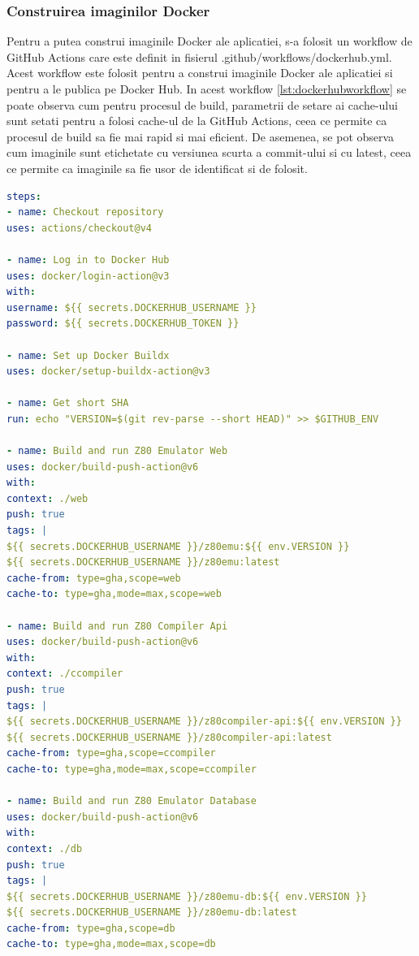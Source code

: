 \documentclass[titlepage,12pt]{article}
\DeclareRobustCommand{\code}[1]{{\ttfamily\small #1}}
\begin{document}
\subsubsection{Construirea imaginilor Docker}
Pentru a putea construi imaginile Docker ale aplicatiei, s-a folosit un workflow de GitHub Actions care este definit in fisierul \code{.github/workflows/dockerhub.yml}. Acest workflow este folosit pentru a construi imaginile Docker ale aplicatiei si pentru a le publica pe Docker Hub. In acest workflow \cref{lst:dockerhubworkflow} se poate observa cum pentru procesul de build, parametrii de setare ai cache-ului sunt setati pentru a folosi cache-ul de la GitHub Actions, ceea ce permite ca procesul de build sa fie mai rapid si mai eficient. De asemenea, se pot observa cum imaginile sunt etichetate cu versiunea scurta a commit-ului si cu \code{latest}, ceea ce permite ca imaginile sa fie usor de identificat si de folosit.

\begin{lstlisting}[language=yaml,caption={Workflow de construire a imaginilor Docker},label={lst:dockerhubworkflow}]
steps:
- name: Checkout repository
uses: actions/checkout@v4

- name: Log in to Docker Hub
uses: docker/login-action@v3
with:
username: ${{ secrets.DOCKERHUB_USERNAME }}
password: ${{ secrets.DOCKERHUB_TOKEN }}

- name: Set up Docker Buildx
uses: docker/setup-buildx-action@v3

- name: Get short SHA
run: echo "VERSION=$(git rev-parse --short HEAD)" >> $GITHUB_ENV

- name: Build and run Z80 Emulator Web
uses: docker/build-push-action@v6
with:
context: ./web
push: true
tags: |
${{ secrets.DOCKERHUB_USERNAME }}/z80emu:${{ env.VERSION }}
${{ secrets.DOCKERHUB_USERNAME }}/z80emu:latest
cache-from: type=gha,scope=web
cache-to: type=gha,mode=max,scope=web

- name: Build and run Z80 Compiler Api
uses: docker/build-push-action@v6
with:
context: ./ccompiler
push: true
tags: |
${{ secrets.DOCKERHUB_USERNAME }}/z80compiler-api:${{ env.VERSION }}
${{ secrets.DOCKERHUB_USERNAME }}/z80compiler-api:latest
cache-from: type=gha,scope=ccompiler
cache-to: type=gha,mode=max,scope=ccompiler

- name: Build and run Z80 Emulator Database
uses: docker/build-push-action@v6
with:
context: ./db
push: true
tags: |
${{ secrets.DOCKERHUB_USERNAME }}/z80emu-db:${{ env.VERSION }}
${{ secrets.DOCKERHUB_USERNAME }}/z80emu-db:latest
cache-from: type=gha,scope=db
cache-to: type=gha,mode=max,scope=db
\end{lstlisting}
\end{document}
